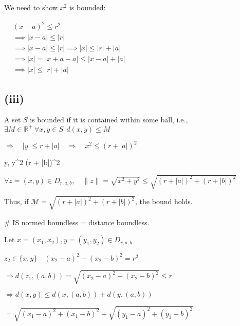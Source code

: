 \documentclass{article}
\theoremstyle{definition}
\numberwithin{equation}{section}
\begin{document}
We need to show $x^2$ is bounded:

$
\begin{aligned}
    &(x - a)^2 \leq r^2 \\
    &\implies |x - a| \leq |r| \\
    &\implies |x - a| \leq |r| \implies |x| \leq |r| + |a| \\
    &\implies |x| = |x + a - a| \leq |x - a| + |a| \\
    &\implies |x| \leq |r| + |a|
\end{aligned}
$

\subsection*{(iii)}

A set $S$ is bounded if it is contained within some ball, i.e., $\exists M \in \mathbb{R}^+ \ \forall x, y \in S \ \ d(x, y) \leq M$

\begin{center}
\end{center}

$
\Rightarrow \quad |y| \leq r + |a| \quad 
\Rightarrow \quad x^2 \leq (r + |a|)^2
$

 y, \quad y^2 \leq (r + |b|)^2

$
\forall z = (x, y) \in D_{r,a,b}, \quad \|z\| = \sqrt{x^2 + y^2} \leq \sqrt{(r + |a|)^2 + (r + |b|)^2}
$

Thus, if \(\mathcal{M} = \sqrt{(r + |a|)^2 + (r + |b|)^2}\), the bound holds.

\# IS normed boundless = distance boundless.

Let \(x = (x_1, x_2), y = (y_1, y_2) \in D_{r, a, b}\)

$
z_2 \in \{x,y\} \quad (x_2 - a)^2 + (x_2 - b)^2 = r^2 
$

$
\Rightarrow d(z_1, (a,b)) = \sqrt{(x_2 - a)^2 + (x_2 - b)^2} \leq r
$

$
\Rightarrow d(x, y) \leq d(x, (a,b)) + d(y, (a,b)) 
$

$
= \sqrt{(x_1 - a)^2 + (x_1 - b)^2} + \sqrt{(y_1 - a)^2 + (y_1 - b)^2} 
$
\end{document}
